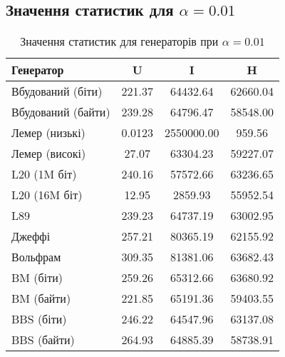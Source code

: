 \documentclass[12pt]{article}
\begin{document}
\subsection{Значення статистик для $\alpha = 0.01$}
\begin{table}[htbp]
\centering
\small
\begin{tabular}{l*{3}{c}}
\toprule
\textbf{Генератор} & \textbf{U} & \textbf{I} & \textbf{H} \\
\midrule
Вбудований (біти)  & 221.37 & 64432.64 & 62660.04 \\
Вбудований (байти) & 239.28 & 64796.47 & 58548.00 \\
Лемер (низькі)     & 0.0123 & 2550000.00 & 959.56 \\
Лемер (високі)     & 27.07 & 63304.23 & 59227.07 \\
L20 (1M біт)       & 240.16 & 57572.66 & 63236.65 \\
L20 (16M біт)      & 12.95 & 2859.93 & 55952.54 \\
L89                & 239.23 & 64737.19 & 63002.95 \\
Джеффі             & 257.21 & 80365.19 & 62155.92 \\
Вольфрам           & 309.35 & 81381.06 & 63682.43 \\
BM (біти)          & 259.26 & 65312.66 & 63680.92 \\
BM (байти)         & 221.85 & 65191.36 & 59403.55 \\
BBS (біти)         & 246.22 & 64547.96 & 63137.08 \\
BBS (байти)        & 264.93 & 64885.39 & 58738.91 \\
\bottomrule
\end{tabular}
\caption{Значення статистик для генераторів при $\alpha = 0.01$}
\label{tab:statistics_alpha_01}
\end{table}

\newpage
\end{document}
